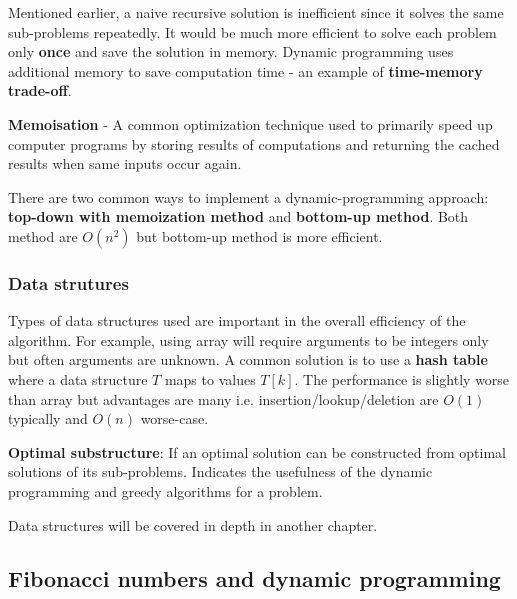\documentclass[10pt,a4paper]{article}
\begin{document}
Mentioned earlier, a naive recursive solution is inefficient since it solves the same sub-problems
repeatedly. It would be much more efficient to solve each problem only \textbf{once} and save the
solution in memory. Dynamic programming uses additional memory to save computation time - an example
of \textbf{time-memory trade-off}. 

\begin{tcolorbox}[breakable,colback=white]
\textbf{Memoisation} - A common optimization technique used to primarily speed up computer programs by
storing results of computations and returning the cached results when same inputs occur again.
\end{tcolorbox}

There are two common ways to implement a dynamic-programming approach: \textbf{top-down with
memoization method} and \textbf{bottom-up method}. Both method are \textbf{$O(n^2)$} but bottom-up method is
more efficient.

\subsubsection{Data strutures}

Types of data structures used are important in the overall efficiency of the algorithm. For example,
using array will require arguments to be integers only but often arguments are unknown. A common
solution is to use a \textbf{hash table} where a data structure $T$ maps to values $T[k]$. The
performance is slightly worse than array but advantages are many i.e. insertion/lookup/deletion are
$O(1)$ typically and $O(n)$ worse-case. \par 

\begin{tcolorbox}[breakable,colback=white]
\textbf{Optimal substructure}: If an optimal solution can be constructed from optimal solutions of
its sub-problems. Indicates the usefulness of the dynamic programming and greedy algorithms for a problem.
\end{tcolorbox}

Data structures will be covered in depth in another chapter. 

\pagebreak

\subsection{Fibonacci numbers and dynamic programming}
\end{document}
